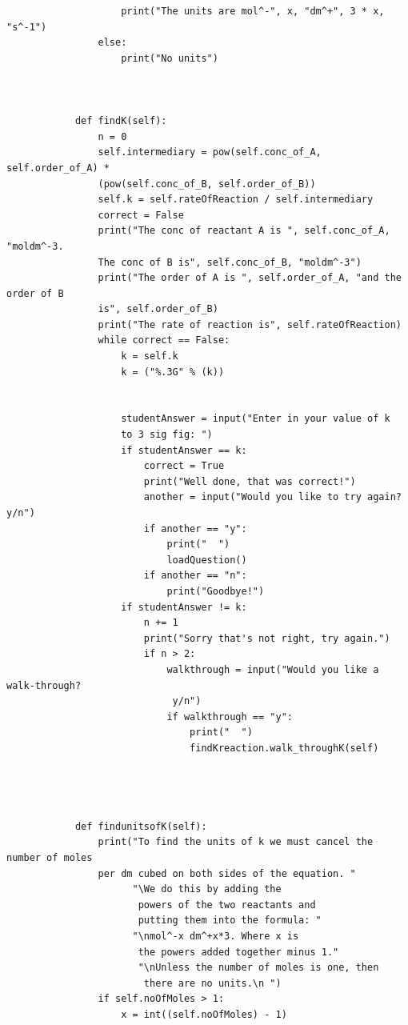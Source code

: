 \documentclass[a4paper,12pt]{report}
\begin{document}
\begin{verbatim}
                    print("The units are mol^-", x, "dm^+", 3 * x, "s^-1")
                else:
                    print("No units")        
                
        
        
            def findK(self):
                n = 0
                self.intermediary = pow(self.conc_of_A, self.order_of_A) *
                (pow(self.conc_of_B, self.order_of_B))
                self.k = self.rateOfReaction / self.intermediary
                correct = False
                print("The conc of reactant A is ", self.conc_of_A, "moldm^-3.
                The conc of B is", self.conc_of_B, "moldm^-3")
                print("The order of A is ", self.order_of_A, "and the order of B
                is", self.order_of_B)
                print("The rate of reaction is", self.rateOfReaction)
                while correct == False:
                    k = self.k
                    k = ("%.3G" % (k))
                    
        
                    studentAnswer = input("Enter in your value of k
                    to 3 sig fig: ")
                    if studentAnswer == k:
                        correct = True
                        print("Well done, that was correct!")
                        another = input("Would you like to try again? y/n")
                        if another == "y":
                            print("  ")
                            loadQuestion()
                        if another == "n":
                            print("Goodbye!")
                    if studentAnswer != k:
                        n += 1
                        print("Sorry that's not right, try again.")
                        if n > 2:
                            walkthrough = input("Would you like a walk-through? 
                           	 y/n")
                            if walkthrough == "y":
                                print("  ")
                                findKreaction.walk_throughK(self)
                        
                            
        
        
            def findunitsofK(self):
                print("To find the units of k we must cancel the number of moles 
                per dm cubed on both sides of the equation. "
                      "\We do this by adding the
                       powers of the two reactants and
                       putting them into the formula: "
                      "\nmol^-x dm^+x*3. Where x is
                       the powers added together minus 1."
                       "\nUnless the number of moles is one, then
                        there are no units.\n ")
                if self.noOfMoles > 1:
                    x = int((self.noOfMoles) - 1)
        

\end{verbatim}
\end{document}
